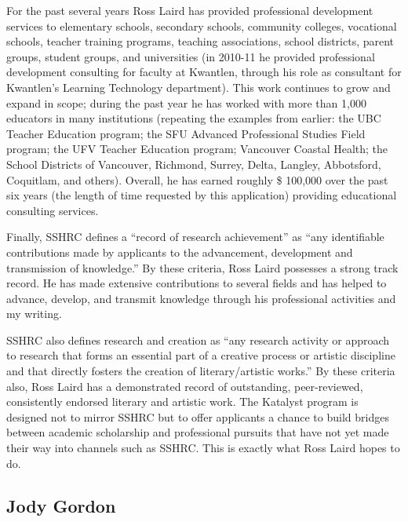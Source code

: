 \documentclass[letterpaper,10pt,headsepline]{scrreprt}
\begin{document}
For the past several years Ross Laird has provided professional development
services to elementary schools, secondary schools, community colleges,
vocational schools, teacher training programs, teaching associations, school
districts, parent groups, student groups, and universities (in 2010-11 he
provided professional development consulting for faculty at Kwantlen, through
his role as consultant for Kwantlen's Learning Technology department). This
work continues to grow and expand in scope; during the past year he has worked
with more than 1,000 educators in many institutions (repeating the examples
from earlier: the UBC Teacher Education program; the SFU Advanced Professional
Studies Field program; the UFV Teacher Education program; Vancouver Coastal
Health; the School Districts of Vancouver, Richmond, Surrey, Delta, Langley,
Abbotsford, Coquitlam, and others). Overall, he has earned roughly \$ 100,000
over the past six years (the length of time requested by this application)
providing educational consulting services.

Finally, SSHRC defines a ``record of research achievement'' as ``any identifiable
contributions made by applicants to the advancement, development and
transmission of knowledge.'' By these criteria, Ross Laird possesses a strong
track record. He has made extensive contributions to several fields and has
helped to advance, develop, and transmit knowledge through his professional
activities and my writing.

SSHRC also defines research and creation as ``any research activity or approach
to research that forms an essential part of a creative process or artistic
discipline and that directly fosters the creation of literary/artistic works.''
By these criteria also, Ross Laird has a demonstrated record of outstanding,
peer-reviewed, consistently endorsed literary and artistic work. The Katalyst
program is designed not to mirror SSHRC but to offer applicants a chance to
build bridges between academic scholarship and professional pursuits that have
not yet made their way into channels such as SSHRC. This is exactly what Ross
Laird hopes to do.

\subsection{Jody Gordon}
\end{document}

